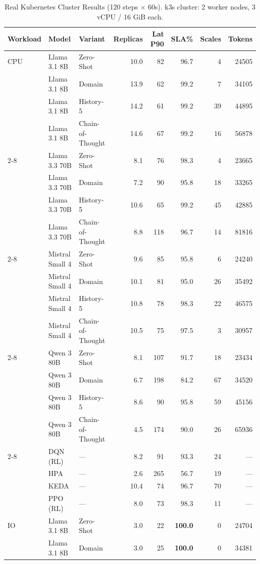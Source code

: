 \begin{table}[t]
\centering\small
\caption{Real Kubernetes Cluster Results (120 steps $\times$ 60s). k3s cluster: 2 worker nodes, 3 vCPU / 16 GiB each.}
\label{tab:k8s_v2}
\begin{tabular}{lllrrrrr}
\toprule
Workload & Model & Variant & Replicas & Lat P90 & SLA\% & Scales & Tokens \\
\midrule
CPU & Llama 3.1 8B & Zero-Shot & 10.0 & 82 & 96.7 & 4 & 24505 \\
 & Llama 3.1 8B & Domain & 13.9 & 62 & 99.2 & 7 & 34105 \\
 & Llama 3.1 8B & History-5 & 14.2 & 61 & 99.2 & 39 & 44895 \\
 & Llama 3.1 8B & Chain-of-Thought & 14.6 & 67 & 99.2 & 16 & 56878 \\
\cmidrule{2-8}
 & Llama 3.3 70B & Zero-Shot & 8.1 & 76 & 98.3 & 4 & 23665 \\
 & Llama 3.3 70B & Domain & 7.2 & 90 & 95.8 & 18 & 33265 \\
 & Llama 3.3 70B & History-5 & 10.6 & 65 & 99.2 & 45 & 42885 \\
 & Llama 3.3 70B & Chain-of-Thought & 8.8 & 118 & 96.7 & 14 & 81816 \\
\cmidrule{2-8}
 & Mistral Small 4 & Zero-Shot & 9.6 & 85 & 95.8 & 6 & 24240 \\
 & Mistral Small 4 & Domain & 10.1 & 81 & 95.0 & 26 & 35492 \\
 & Mistral Small 4 & History-5 & 10.8 & 78 & 98.3 & 22 & 46575 \\
 & Mistral Small 4 & Chain-of-Thought & 10.5 & 75 & 97.5 & 3 & 30957 \\
\cmidrule{2-8}
 & Qwen 3 80B & Zero-Shot & 8.1 & 107 & 91.7 & 18 & 23434 \\
 & Qwen 3 80B & Domain & 6.7 & 198 & 84.2 & 67 & 34520 \\
 & Qwen 3 80B & History-5 & 8.6 & 90 & 95.8 & 59 & 45156 \\
 & Qwen 3 80B & Chain-of-Thought & 4.5 & 174 & 90.0 & 26 & 65936 \\
\cmidrule{2-8}
 & DQN (RL) & — & 8.2 & 91 & 93.3 & 24 & — \\
 & HPA & — & 2.6 & 265 & 56.7 & 19 & — \\
 & KEDA & — & 10.4 & 74 & 96.7 & 70 & — \\
 & PPO (RL) & — & 8.0 & 73 & 98.3 & 11 & — \\
\midrule
IO & Llama 3.1 8B & Zero-Shot & 3.0 & 22 & \textbf{100.0} & 0 & 24704 \\
 & Llama 3.1 8B & Domain & 3.0 & 25 & \textbf{100.0} & 0 & 34381 \\

\end{tabular}
\end{table}
